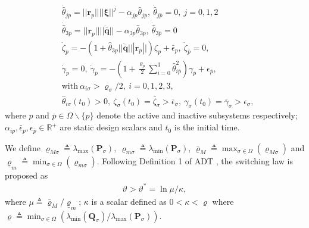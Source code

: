 \documentclass[AMA,STIX1COL,sort, compress]{WileyNJD-v2}
\begin{document}
\begin{subequations}\label{split_adap}
	\begin{align}
	& \dot{\hat{\theta}}_{jp} =|| \mathbf{r}_p|| || \boldsymbol \xi ||^{j} - \alpha_{jp}{\hat{\theta}}_{j p},~\dot{\hat{\theta}}_{j \overline p}=0,~j=0,1,2 \label{hat_theta1}\\
	&\dot{\hat{\theta}}_{3p} =|| \mathbf{r}_p|| || \ddot{\overline{\mathbf q}} || - \alpha_{3p }{\hat{\theta}}_{3 p},~\dot{\hat{\theta}}_{3 \overline p}=0 \label{hat_theta} \\
	& \dot{\zeta}_{p} = - \left(1 + \hat{\theta}_{3p} || \ddot{\overline{\mathbf q}} || | \mathbf{r}_p || \right) {\zeta}_{ p}+  \bar{\epsilon}_{ p},~ \dot{\zeta}_{\overline p} = 0 \label{zeta}, \\
	& \dot{\gamma}_{p} = 0,~ \dot{\gamma}_{\overline p} = - \left(1 + \frac{\varrho_{\overline{p}}}{2} \sum_{i=0}^{3}{\hat{\theta}}_{i \overline p}^2   \right) {\gamma}_{\overline p} +  {\epsilon}_{\overline p} \label{gamma}, \\
	&\text{with}~\alpha_{i\sigma}> \varrho_{\sigma}/2, ~i=0,1,2,3, \label{alpha}\\
	& \hat{\theta}_{i\sigma} (t_0)>0,~\zeta_{\sigma}(t_0)=\bar{\zeta}_{\sigma} > {\bar \epsilon}_{\sigma }, ~ \gamma_{\sigma}(t_0)=\bar{\gamma}_{\sigma} > {\epsilon}_{\sigma },\label{init} 
	\end{align}
\end{subequations}
where $p$ and $\overline{p} \in \Omega \backslash \lbrace p \rbrace$ denote the active and inactive subsystems respectively; $\alpha_{ip},\bar{\epsilon}_p,\epsilon_{\overline{p}} \in \mathbb{R}^{+}$ are static design scalars and $t_0$ is the initial time. 

We define $\varrho_{M \sigma} \triangleq \lambda_{\max}( \mathbf{P}_{\sigma} ),~ \varrho_{m\sigma} \triangleq \lambda_{\min}( \mathbf{P}_{\sigma} )$, ${\bar{\varrho}_M} \triangleq \max_{\sigma \in \Omega}(\varrho_{M\sigma})$ and ${\underline{\varrho}_m} \triangleq \min_{\sigma \in \Omega} (\varrho_{m\sigma})$. Following Definition 1 of ADT \cite{hespanha1999stability}, the switching law is proposed as
\begin{align}
\vartheta > \vartheta^{*} =  \ln \mu/{\kappa},  \label{sw_law}
\end{align}
where $\mu \triangleq {\bar{\varrho}_M} / \underline{\varrho}_{m}$; $\kappa$ is a scalar defined as $0< \kappa < \varrho$ where $\varrho \triangleq \min_{\sigma \in \Omega}({\lambda_{\min}( \mathbf{Q}_{\sigma} )}/{\lambda_{\max}( \mathbf{P}_{\sigma} )})$.
\end{document}
